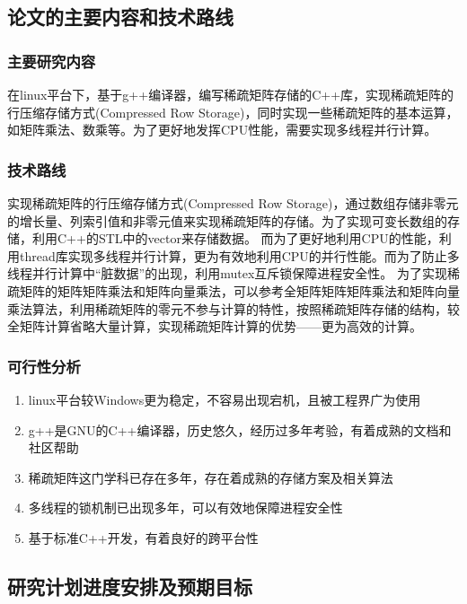 \documentclass{article}
\begin{document}
\subsection{论文的主要内容和技术路线}


\subsubsection{主要研究内容} 
     在linux平台下，基于g++编译器，编写稀疏矩阵存储的C++库，实现稀疏矩阵的行压缩存储方式(Compressed Row Storage)，同时实现一些稀疏矩阵的基本运算，如矩阵乘法、数乘等。为了更好地发挥CPU性能，需要实现多线程并行计算。
     
 \subsubsection{技术路线} 
 
实现稀疏矩阵的行压缩存储方式(Compressed Row Storage)，通过数组存储非零元的增长量、列索引值和非零元值来实现稀疏矩阵的存储。为了实现可变长数组的存储，利用C++的STL中的vector来存储数据。
\newline
而为了更好地利用CPU的性能，利用thread库实现多线程并行计算，更为有效地利用CPU的并行性能。而为了防止多线程并行计算中“脏数据”的出现，利用mutex互斥锁保障进程安全性。
\newline
为了实现稀疏矩阵的矩阵矩阵乘法和矩阵向量乘法，可以参考全矩阵矩阵矩阵乘法和矩阵向量乘法算法，利用稀疏矩阵的零元不参与计算的特性，按照稀疏矩阵存储的结构，较全矩阵计算省略大量计算，实现稀疏矩阵计算的优势——更为高效的计算。
\newline
	

\subsubsection{可行性分析}
     \begin{enumerate}[1]
\item 	linux平台较Windows更为稳定，不容易出现宕机，且被工程界广为使用
\item 	g++是GNU的C++编译器，历史悠久，经历过多年考验，有着成熟的文档和社区帮助
\item		稀疏矩阵这门学科已存在多年，存在着成熟的存储方案及相关算法
\item		多线程的锁机制已出现多年，可以有效地保障进程安全性
\item		基于标准C++开发，有着良好的跨平台性

\end{enumerate}


\subsection{研究计划进度安排及预期目标}
\end{document}
